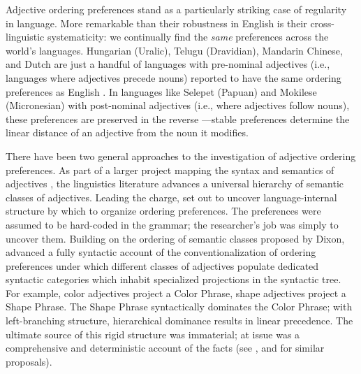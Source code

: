 \documentclass[12pt]{article}
\begin{document}
Adjective ordering preferences stand as a particularly striking case of regularity in language. More remarkable than their robustness in English is their cross-linguistic systematicity: we continually find the \emph{same} preferences across the world's languages. Hungarian (Uralic), Telugu (Dravidian), Mandarin Chinese, and Dutch are just a handful of languages with pre-nominal adjectives (i.e., languages where adjectives precede nouns) reported to have the same ordering preferences as English \citep{Martin1969a,hetzron1978,dixon1982,Sproat1991,LaPolla2004}.  In languages like Selepet (Papuan) and Mokilese (Micronesian) with post-nominal adjectives (i.e., where adjectives follow nouns), these preferences are preserved in the reverse \citep{hetzron1978,dixon1982,Sproat1991}---stable preferences determine the linear distance of an adjective from the noun it modifies.

There have been two general approaches to the investigation of adjective ordering preferences. 
As part of a larger project mapping the syntax and semantics of adjectives%
, the linguistics literature advances a universal hierarchy of semantic classes of adjectives. Leading the charge, \citet{dixon1982} set out to uncover language-internal structure by which to organize ordering preferences. The preferences were assumed to be hard-coded in the grammar; the researcher's job was simply to uncover them. 
Building on the ordering of semantic classes proposed by Dixon, \cite{Cinque1994} advanced a fully syntactic account of the conventionalization of ordering preferences under which different classes of adjectives populate dedicated syntactic categories which inhabit specialized projections in the syntactic tree. For example, color adjectives project a Color Phrase, shape adjectives project a Shape Phrase. The Shape Phrase syntactically dominates the Color Phrase; with left-branching structure, hierarchical dominance results in linear precedence. The ultimate source of this rigid structure was immaterial; at issue was a comprehensive and deterministic account of the facts (see \citealp{scott2002}, and \citealp{laenzlinger2005} for similar proposals). 
\end{document}
